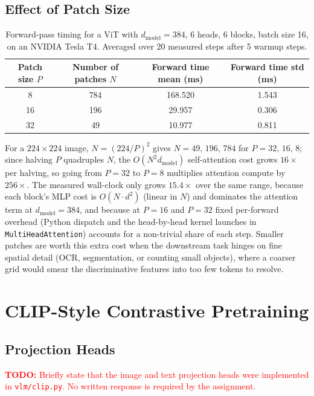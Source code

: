 \documentclass[11pt]{article}
\newcommand{\TODO}[1]{\textcolor{red}{\textbf{TODO:} #1}}
\newcommand{\class}[1]{\texttt{#1}}
\begin{document}
\subsection{Effect of Patch Size}

\begin{table}[H]
    \centering
    \begin{tabular}{cccc}
        \toprule
        Patch size $P$ & Number of patches $N$ & Forward time mean (ms) & Forward time std (ms) \\
        \midrule
        8  & 784 & 168.520 & 1.543 \\
        16 & 196 & 29.957  & 0.306 \\
        32 & 49  & 10.977  & 0.811 \\
        \bottomrule
    \end{tabular}
    \caption{Forward-pass timing for a ViT with $d_{\mathrm{model}}=384$, 6 heads, 6 blocks, batch size 16, on an NVIDIA Tesla T4. Averaged over 20 measured steps after 5 warmup steps.}
    \label{tab:vit-patch-size}
\end{table}

For a $224\times 224$ image, $N=(224/P)^2$ gives $N=49,\,196,\,784$ for $P=32,\,16,\,8$; since halving $P$ quadruples $N$, the $O(N^2 d_{\mathrm{model}})$ self-attention cost grows $16\times$ per halving, so going from $P=32$ to $P=8$ multiplies attention compute by $256\times$. The measured wall-clock only grows $15.4\times$ over the same range, because each block's MLP cost is $O(N\cdot d^2)$ (linear in $N$) and dominates the attention term at $d_{\mathrm{model}}=384$, and because at $P=16$ and $P=32$ fixed per-forward overhead (Python dispatch and the head-by-head kernel launches in \texttt{MultiHeadAttention}) accounts for a non-trivial share of each step. Smaller patches are worth this extra cost when the downstream task hinges on fine spatial detail (OCR, segmentation, or counting small objects), where a coarser grid would smear the discriminative features into too few tokens to resolve.

\section{CLIP-Style Contrastive Pretraining}

\subsection{Projection Heads}

\TODO{Briefly state that the image and text projection heads were implemented in \class{vlm/clip.py}. No written response is required by the assignment.}
\end{document}
